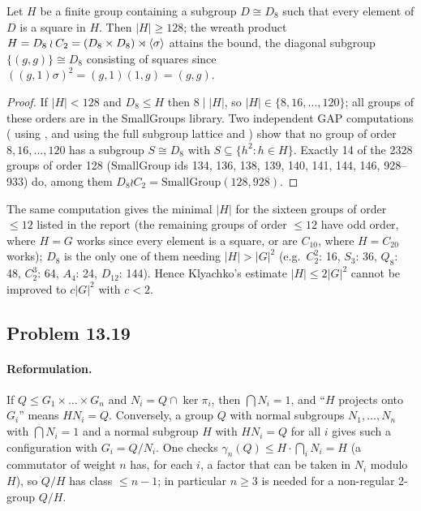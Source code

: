 \begin{theorem}
Let $H$ be a finite group containing a subgroup $D\cong D_8$ such that every element of $D$ is a square in $H$. Then
$|H|\ge 128$; the wreath product $H=D_8\wr C_2=(D_8\times D_8)\rtimes\langle \sigma\rangle$ attains the bound, the diagonal
subgroup $\{(g,g)\}\cong D_8$ consisting of squares since $((g,1)\sigma)^2=(g,1)(1,g)=(g,g)$.
\end{theorem}
\begin{proof}
If $|H|<128$ and $D_8\le H$ then $8\mid|H|$, so $|H|\in\{8,16,\dots,120\}$; all groups of these orders are in the
SmallGroups library. Two independent GAP computations ( using
, and  using the full subgroup lattice and ) show
that no group of order $8,16,\dots,120$ has a subgroup $S\cong D_8$ with $S\subseteq\{h^2:h\in H\}$. Exactly 14 of the
2328 groups of order 128 (SmallGroup ids 134, 136, 138, 139, 140, 141, 144, 146, 928--933) do, among them
$D_8\wr C_2=\mathrm{SmallGroup}(128,928)$.
\end{proof}
The same computation gives the minimal $|H|$ for the sixteen groups of order $\le 12$ listed in the report (the remaining groups of order $\le 12$ have odd order, where $H=G$ works since every element is a square, or are
$C_{10}$, where $H=C_{20}$ works);
$D_8$ is the only one of them needing $|H|>|G|^2$ (e.g.\ $C_2^2$: 16, $S_3$: 36, $Q_8$: 48, $C_2^3$: 64, $A_4$: 24, $D_{12}$: 144). Hence
Klyachko's estimate $|H|\le 2|G|^2$ cannot be improved to $c|G|^2$ with $c<2$.

\subsection{Problem 13.19}\label{app:1319}

\paragraph{Reformulation.} If $Q\le G_1\times\dots\times G_n$ and $N_i=Q\cap\ker\pi_i$, then $\bigcap N_i=1$, and
``$H$ projects onto $G_i$'' means $HN_i=Q$. Conversely, a group $Q$ with normal subgroups $N_1,\dots,N_n$ with
$\bigcap N_i=1$ and a normal subgroup $H$ with $HN_i=Q$ for all $i$ gives such a configuration with $G_i=Q/N_i$.
One checks $\gamma_n(Q)\le H\cdot\bigcap_i N_i=H$ (a commutator of weight $n$ has, for each $i$, a factor that can be
taken in $N_i$ modulo $H$), so $Q/H$ has class $\le n-1$; in particular $n\ge 3$ is needed for a non-regular
2-group $Q/H$.

